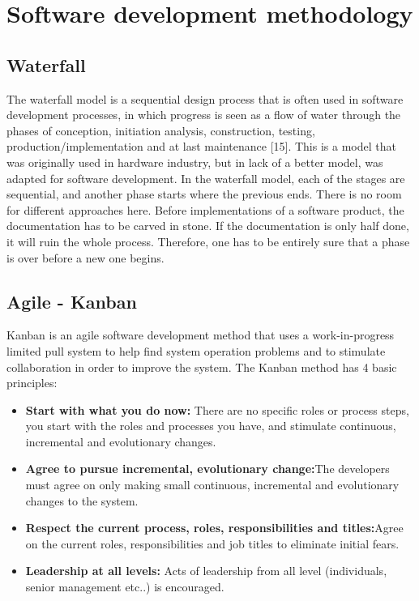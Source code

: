 \section{Software development methodology}

\subsection{Waterfall}
The waterfall model is a sequential design process that is often used in software development processes, in which progress is seen as a flow of water through the phases of conception, initiation analysis, construction, testing, production/implementation and at last maintenance [15]. 
\newline
\newline
This is a model that was originally used in hardware industry, but in lack of a better model, was adapted for software development. In the waterfall model, each of the stages are sequential, and another phase starts where the previous ends. There is no room for different approaches here. Before implementations of a software product, the documentation has to be carved in stone. If the documentation is only half done, it will ruin the whole process. Therefore, one has to be entirely sure that a phase is over before a new one begins. 

\subsection{Agile - Kanban}
Kanban is an agile software development method that uses a work-in-progress limited pull system to help find system operation problems and to stimulate collaboration in order to improve the system.
\newline
The Kanban method has 4 basic principles:
\begin{itemize}
\item{}\textbf{Start with what you do now:} There are no specific roles or process steps, you start with the roles and processes you have, and stimulate continuous, incremental and evolutionary changes.
\item{}\textbf{Agree to pursue incremental, evolutionary change:}The developers must agree on only making small continuous, incremental and evolutionary changes to the system.
\item{}\textbf{Respect the current process, roles, responsibilities and titles:}Agree on the current roles, responsibilities and job titles to eliminate initial fears.
\item{}\textbf{Leadership at all levels:} Acts of leadership from all level (individuals, senior management etc..) is encouraged.
\end{itemize}

